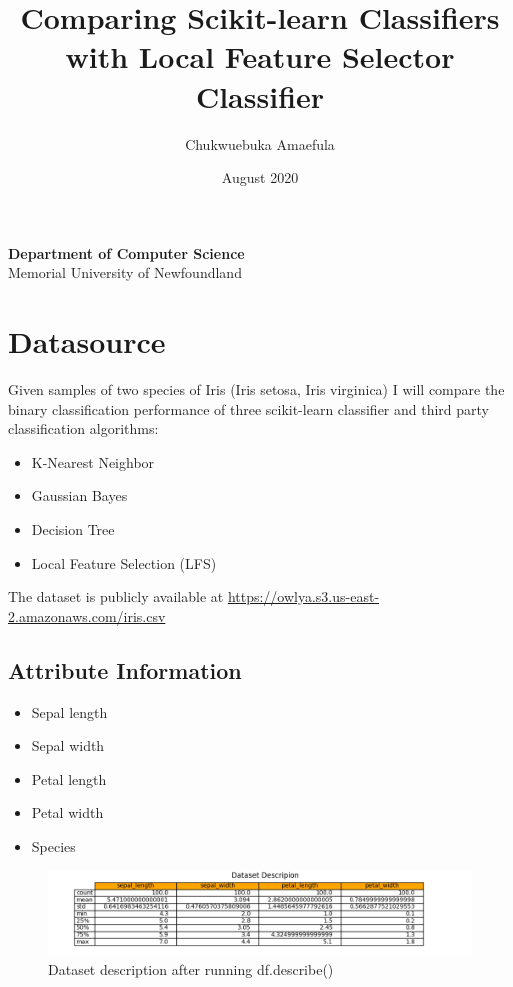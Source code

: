 \documentclass[pdftex,10px,a4paper,oneside]{article}
\title{Comparing Scikit-learn Classifiers with Local Feature Selector Classifier}
\author{Chukwuebuka Amaefula }
\date{August 2020}
\begin{document}
\maketitle
\begin{spacing}{2}
    \vspace{20mm}
    \begin{center}
        \textbf{\large Department of Computer Science}\\
        {\large Memorial University of Newfoundland}\\
    \end{center}
\end{spacing}
\clearpage
\section{Datasource}
Given samples of two species of Iris (Iris setosa, Iris virginica) I will compare the binary classification performance of three scikit-learn classifier and third party classification algorithms:
\begin{itemize}
  \item K-Nearest Neighbor
  \item Gaussian Bayes
  \item Decision Tree
  \item Local Feature Selection (LFS)
\end{itemize}

The dataset is publicly available at \url{https://owlya.s3.us-east-2.amazonaws.com/iris.csv}
\subsection{Attribute Information}
\begin{itemize}
    \item Sepal length
    \item Sepal width
    \item Petal length
    \item Petal width
    \item Species
\end{itemize}
\begin{figure}[h]
\includegraphics[scale=0.6]{desc_plot}
\caption{Dataset description after running df.describe()}
\centering
\end{figure}
\end{document}
